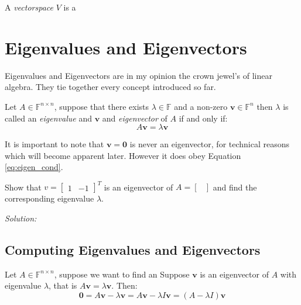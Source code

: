 \documentclass[11pt,a4paper,oneside,openright,english]{article}
\begin{document}
\begin{definition}
  A \textit{vectorspace} $V$ is a
\end{definition}

\section{Eigenvalues and Eigenvectors}
Eigenvalues and Eigenvectors are in my opinion the crown jewel's of linear algebra. They tie together every concept introduced so far.

\begin{definition}
  Let $A \in \mathbb{F}^{n \times n}$, suppose that there exists $\lambda \in \mathbb{F}$ and a non-zero $\mathbf{v} \in \mathbb{F}^{n}$ then $\lambda$ is called an \textit{eigenvalue} and $\mathbf{v}$ and \textit{eigenvector} of $A$ if and only if:
  \begin{equation}\label{eq:eigen_cond}
    A \mathbf{v} = \lambda \mathbf{v}
  \end{equation}
\end{definition}

\begin{remark}
  It is important to note that $\mathbf{v} = \mathbf{0}$ is never an eigenvector, for technical reasons which will become apparent later. However it does obey Equation \eqref{eq:eigen_cond}.
\end{remark}

\begin{example}\label{exmp:}
  Show that $v = \begin{bmatrix} 1 & -1 \end{bmatrix}^{T}$ is an eigenvector of $A = \begin{bmatrix}  \end{bmatrix}$ and find the corresponding eigenvalue $\lambda$.

  \textit{Solution:}
\end{example}
\subsection{Computing Eigenvalues and Eigenvectors}

Let $A \in \mathbb{F}^{n \times n}$, suppose we want to find an
Suppose $\mathbf{v}$ is an eigenvector of $A$ with eigenvalue $\lambda$, that is $A \mathbf{v} = \lambda \mathbf{v}$. Then:
\begin{equation*}
  \mathbf{0} = A \mathbf{v} - \lambda \mathbf{v} = A \mathbf{v} - \lambda I \mathbf{v} = (A - \lambda I) \mathbf{v}
\end{equation*}
\end{document}
